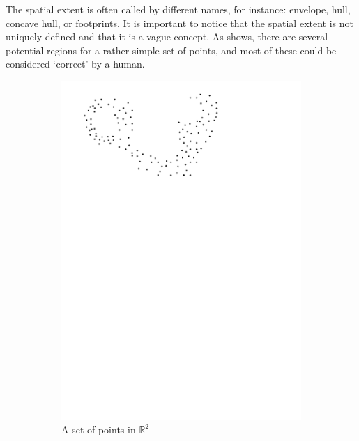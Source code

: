 The spatial extent is often called by different names, for instance: envelope, hull, concave hull, or footprints.
It is important to notice that the spatial extent is not uniquely defined and that it is a vague concept.
As  shows, there are several potential regions for a rather simple set of points, and most of these could be considered `correct' by a human.
\begin{figure}
  \centering
  \begin{subfigure}[b]{0.4\linewidth}
    \centering
    \includegraphics[page=1,width=\textwidth]{figs/idea.pdf}
    \caption{A set of points in $\mathbb{R}^2$}
  \end{subfigure}
  \qquad
  \begin{subfigure}[b]{0.4\linewidth}
    \centering

\end{subfigure}
\end{figure}
